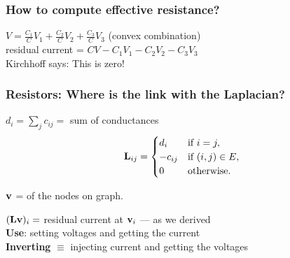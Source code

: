 \documentclass{beamer}
\begin{document}

\newcommand{\topictitle}{Effective Resistance Computation}

\newcommand{\topicsubtitle}{Laplacian Connection and Pseudo-Inverse}

\MakeTopicSlide

\begin{frame}
\frametitle{How to compute effective resistance?}
\pause
{}
\pause
\begin{center}
\end{center}
\smallskip \pause
$V =  \frac{C_1}{C}V_1 +  \frac{C_2}{C}V_2 +  \frac{C_3}{C}V_3$
(convex combination)\\
\smallskip \pause
residual current = $CV - C_1V_1 - C_2V_2 - C_3V_3$ \\
 \pause Kirchhoff says: This is zero! 
\end{frame}
\begin{frame}
\frametitle{Resistors: Where is the link with the Laplacian?}
\pause
{}
\pause
\smallskip
$d_i = \sum_j c_{ij} = $ sum of conductances
\pause
\[
\mathbf{L}_{ij} = 
\begin{cases}
d_i & \mbox{if } i = j, \\
-c_{ij} & \mbox{if } (i,j) \in E, \\ 0 & \mbox{otherwise}. \end{cases}
\]

\pause

$\mathbf{v}$ =  of the nodes on  graph.

\medskip \pause
$(\mathbf{L}\mathbf{v})_i = $ residual current at $\mathbf{v}_i$ --- as we derived
\medskip \pause \\
\textbf{Use}: setting voltages and getting the current\\
\medskip \pause
\textbf{Inverting} $\equiv$ injecting current and getting the voltages
\\ \medskip \pause
{}
\end{frame}
\end{document}
